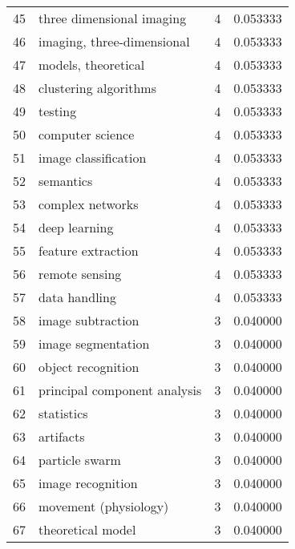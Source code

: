 \begin{tabular}{llrr}
45 &                three dimensional imaging &           4 &    0.053333 \\
46 &               imaging, three-dimensional &           4 &    0.053333 \\
47 &                      models, theoretical &           4 &    0.053333 \\
48 &                    clustering algorithms &           4 &    0.053333 \\
49 &                                  testing &           4 &    0.053333 \\
50 &                         computer science &           4 &    0.053333 \\
51 &                     image classification &           4 &    0.053333 \\
52 &                                semantics &           4 &    0.053333 \\
53 &                         complex networks &           4 &    0.053333 \\
54 &                            deep learning &           4 &    0.053333 \\
55 &                       feature extraction &           4 &    0.053333 \\
56 &                           remote sensing &           4 &    0.053333 \\
57 &                            data handling &           4 &    0.053333 \\
58 &                        image subtraction &           3 &    0.040000 \\
59 &                       image segmentation &           3 &    0.040000 \\
60 &                       object recognition &           3 &    0.040000 \\
61 &             principal component analysis &           3 &    0.040000 \\
62 &                               statistics &           3 &    0.040000 \\
63 &                                artifacts &           3 &    0.040000 \\
64 &                           particle swarm &           3 &    0.040000 \\
65 &                        image recognition &           3 &    0.040000 \\
66 &                    movement (physiology) &           3 &    0.040000 \\
67 &                        theoretical model &           3 &    0.040000 \\

\end{tabular}
